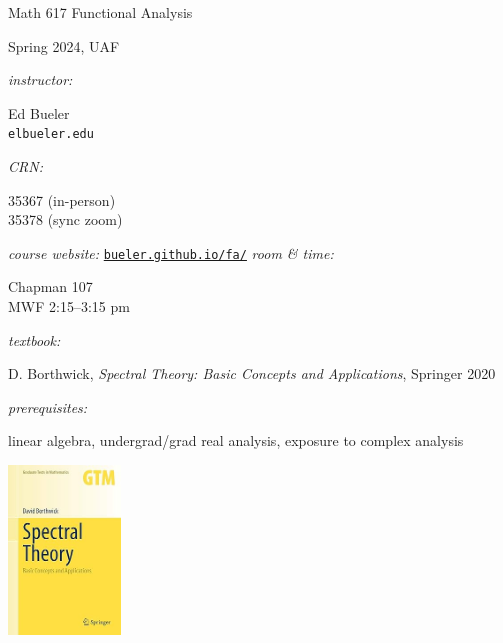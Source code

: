 \documentclass[12pt]{amsart}
\begin{document}
\begin{center}
\Huge Math 617 Functional Analysis

\Large \medskip

Spring 2024, UAF
\end{center}

\thispagestyle{empty}
\vspace{12mm}

\noindent \emph{instructor:} \begin{minipage}[t]{0.5\textwidth} Ed Bueler \\ \texttt{elbueler\@@alaska.edu} \end{minipage} \hfill \emph{CRN:}\, \begin{minipage}[t]{0.25\textwidth} 35367 (in-person) \\ 35378 (sync zoom) \end{minipage}

\medskip
\noindent \emph{course website:} \href{https://bueler.github.io/fa/}{\texttt{bueler.github.io/fa/}} \hfill \emph{room \& time:} \begin{minipage}[t]{0.25\textwidth} Chapman 107 \\ MWF 2:15--3:15 pm \end{minipage}

\medskip
\noindent \emph{textbook:} \begin{minipage}[t]{0.55\textwidth} D. Borthwick, \emph{Spectral Theory: Basic Concepts and Applications}, Springer 2020 \end{minipage}

\bigskip
\noindent \emph{prerequisites:} \begin{minipage}[t]{0.52\textwidth} linear algebra, undergrad/grad real analysis, exposure to complex analysis \end{minipage}

\vspace{-20mm}
\hfill \includegraphics[height=45mm]{../../images/borthwick.jpg}

\vspace{4mm}
\end{document}
